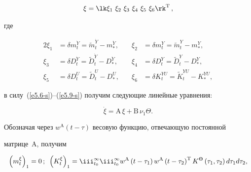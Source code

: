 $$

\xi =\lk \xi_1\ \xi_2\ \xi_3\ \xi_4\ \xi_5\ \xi_6\rk^{\mathrm{T}}\,,

$$







\noindent

где



\pagebreak



\noindent

    \begin{alignat*}{2}

    \xi_1 &=\delta m_t^{\dot Y} =\tilde m_t^{\dot Y} -m_*^{\dot Y},&\quad 

\xi_2 &=\delta m_t^{Y} =\tilde m_t^{ Y} -m_*^{ Y},

\\

    \xi_3&=\delta D_t^{\dot Y} =\tilde D_t^{\dot Y} -D_*^{\dot Y},&\quad 

\xi_4&=\delta D_t^{Y} =\tilde D_t^{Y} -D_*^{Y},

\\

   \xi_5&=\delta D_t^{U} =\tilde D_t^{U} -D_*^{U},&\quad

    \xi_6&=\delta  K_t^{YU} =\tilde K_t^{YU} -K_*^{YU}, %

 \end{alignat*}

в силу~(\ref{e5.6-s})--(\ref{e5.9-s}) получим сле\-ду\-ющие линейные уравнения:

\begin{equation*}

\dot \xi = \mathrm{A}\,\xi +\mathrm{B}\,\nu_1 \Theta.


 \end{equation*}

Обозначая через $w^{\mathrm{A}}(t-\tau)$ весовую функцию, отвечающую постоянной 

матрице~$\mathrm{A}$, получим

\begin{equation*}

    \left(m_t^\xi\right)_1=0\,;\enskip \left(K_t^\xi\right)_1 =\iii_{t_0}^\infty \iii_{t_0}^\infty 

w^{\mathrm{A}} \left(t-\tau_1\right)w^{\mathrm{A}} \left(t-\tau_2\right)^{\mathrm{T}} K^\Theta \left(\tau_1, \tau_2\right) d\tau_1 

d\tau_2,


\end{equation*}

